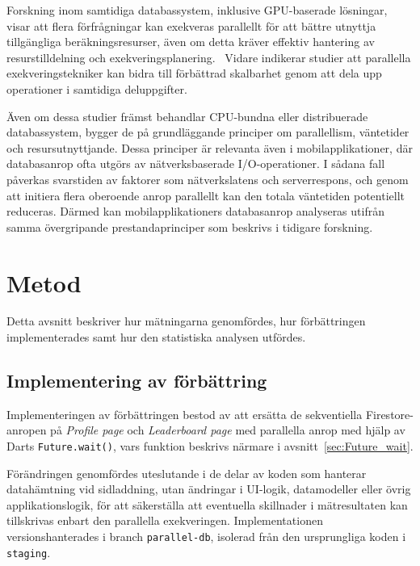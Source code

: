 \documentclass[letterpaper,twocolumn,10pt]{article}
\begin{document}
Forskning inom samtidiga databassystem, inklusive GPU-baserade lösningar, visar
att flera förfrågningar kan exekveras parallellt för att bättre utnyttja
tillgängliga beräkningsresurser, även om detta kräver effektiv hantering av
resurstilldelning och exekveringsplanering.~\cite{li2019concurrent} Vidare
indikerar studier att parallella exekveringstekniker kan bidra till förbättrad
skalbarhet genom att dela upp operationer i samtidiga deluppgifter.~\cite{zhu2025research}

Även om dessa studier främst behandlar CPU-bundna eller distribuerade databassystem, bygger de på grundläggande principer om parallellism, väntetider och resursutnyttjande. Dessa principer är relevanta även i mobilapplikationer, där databasanrop ofta utgörs av nätverksbaserade I/O-operationer. I sådana fall påverkas svarstiden av faktorer som nätverkslatens och serverrespons, och genom att initiera flera oberoende anrop parallellt kan den totala väntetiden potentiellt reduceras. Därmed kan mobilapplikationers databasanrop analyseras utifrån samma övergripande prestandaprinciper som beskrivs i tidigare forskning.

\section{Metod}

Detta avsnitt beskriver hur mätningarna genomfördes, 
hur förbättringen implementerades samt hur den statistiska 
analysen utfördes.

\subsection{Implementering av förbättring}

Implementeringen av förbättringen bestod av att ersätta de sekventiella 
Firestore-anropen på \textit{Profile page} och \textit{Leaderboard page} med 
parallella anrop med hjälp av Darts \texttt{Future.wait()}, vars funktion 
beskrivs närmare i avsnitt~\ref{sec:Future_wait}.

Förändringen genomfördes uteslutande i de delar av koden som hanterar 
datahämtning vid sidladdning, utan ändringar i UI-logik, datamodeller eller 
övrig applikationslogik, för att säkerställa att eventuella skillnader i 
mätresultaten kan tillskrivas enbart den parallella exekveringen. Implementationen 
versionshanterades i branch \texttt{parallel-db}, isolerad från den ursprungliga 
koden i \texttt{staging}.
\end{document}
